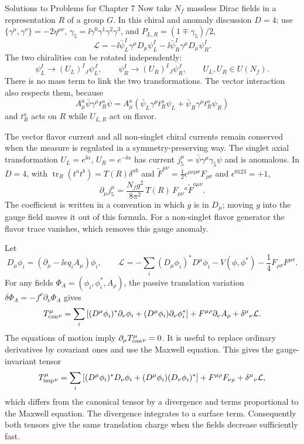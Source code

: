 \begin{bankssolutions}{Solutions to Problems for Chapter 7}
Now take $N_f$ massless Dirac fields in a representation $R$ of a group
$G$.  In this chiral and anomaly discussion $D=4$; use
$\{\gamma^\mu,\gamma^\nu\}=-2\eta^{\mu\nu}$,
$\gamma_5=\ii\gamma^0\gamma^1\gamma^2\gamma^3$, and
$P_{L,R}=(1\mp\gamma_5)/2$,
\[
 \mathcal L=-\ii\bar\psi_L^I\gamma^\mu D_\mu\psi_L^I
 -\ii\bar\psi_R^I\gamma^\mu D_\mu\psi_R^I .
\]
The two chiralities can be rotated independently:
\[
 \psi_L^I\longrightarrow (U_L)^I{}_{J}\psi_L^J,
 \qquad
 \psi_R^I\longrightarrow (U_R)^I{}_{J}\psi_R^J,
 \qquad U_L,U_R\in U(N_f).
\]
There is no mass term to link the two transformations.  The vector
interaction also respects them, because
\[
 A_\mu^a\bar\psi\gamma^\mu t_R^a\psi
 =A_\mu^a\left(\bar\psi_L\gamma^\mu t_R^a\psi_L
 +\bar\psi_R\gamma^\mu t_R^a\psi_R\right)
\]
and $t_R^a$ acts on $R$ while $U_{L,R}$ act on flavor.

The vector flavor current and all non-singlet chiral currents remain
conserved when the measure is regulated in a symmetry-preserving way.  The
singlet axial transformation $U_L=e^{\ii\alpha}$,
$U_R=e^{-\ii\alpha}$ has current
$j_5^\mu=\bar\psi\gamma^\mu\gamma_5\psi$ and is anomalous.  In $D=4$, with
$\operatorname{tr}_R(t^at^b)=T(R)\delta^{ab}$ and
$\widetilde F^{\mu\nu}=\frac12\epsilon^{\mu\nu\rho\sigma}F_{\rho\sigma}$ and
$\epsilon^{0123}=+1$,
\[
 \partial_\mu j_5^\mu
 =\frac{N_f g^2}{8\pi^2}\,
 T(R)\,F_{\mu\nu}{}^a\widetilde F^{a\mu\nu}.
\]
The coefficient is written in a convention in which $g$ is in
$D_\mu$; moving $g$ into the gauge field moves it out of this formula.
For a non-singlet flavor generator the flavor trace vanishes, which removes
this gauge anomaly.

Let
\[
 D_\mu\phi_i=(\partial_\mu-\ii e q_iA_\mu)\phi_i,
 \qquad
 \mathcal L=-\sum_i(D_\mu\phi_i)^*D^\mu\phi_i
 -V(\phi,\phi^*)-\frac14F_{\rho\sigma}F^{\rho\sigma}.
\]
For any fields $\Phi_A=(\phi_i,\phi_i^*,A_\rho)$, the passive translation
variation $\delta\Phi_A=-f^\nu\partial_\nu\Phi_A$ gives
\[
 T_{\rm can}^{\mu}{}_{\nu}
 =\sum_i\left[(D^\mu\phi_i)^*\partial_\nu\phi_i
 +(D^\mu\phi_i)\partial_\nu\phi_i^*\right]
 +F^{\mu\rho}\partial_\nu A_\rho
 +\delta^\mu{}_\nu\mathcal L.
\]
The equations of motion imply
$\partial_\mu T_{\rm can}^{\mu}{}_{\nu}=0$.  It is useful to replace
ordinary derivatives by covariant ones and use the Maxwell equation.  This
gives the gauge-invariant tensor
\[
 T_{\rm imp}^{\mu}{}_{\nu}
 =\sum_i\left[(D^\mu\phi_i)^*D_\nu\phi_i
 +(D^\mu\phi_i)(D_\nu\phi_i)^*\right]
 +F^{\mu\rho}F_{\nu\rho}
 +\delta^\mu{}_\nu\mathcal L,
\]
which differs from the canonical tensor by a divergence and terms
proportional to the Maxwell equation.  The divergence integrates to a
surface term.  Consequently both tensors give the same translation charge
when the fields decrease sufficiently fast.


\end{bankssolutions}
